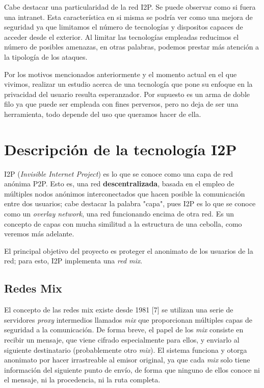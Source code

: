 \documentclass[12]{article}
\begin{document}
Cabe destacar una particularidad de la red I2P. Se puede observar como si fuera una intranet. Esta característica en si misma se podría ver 
como una mejora de seguridad ya que limitamos el número de tecnologías y dispositos capaces de acceder desde el exterior. Al limitar las tecnologías 
empleadas reducimos el número de posibles amenazas, en otras palabras, podemos prestar más atención a la tipología de los ataques. 

Por los motivos mencionados anteriormente y el momento actual en el que vivimos, realizar un estudio acerca de una tecnología que 
pone su enfoque en la privacidad del usuario resulta esperanzador. Por supuesto es un arma de doble filo ya que puede ser empleada con fines 
perversos, pero no deja de ser una herramienta, todo depende del uso que queramos hacer de ella.

\pagebreak

\section{Descripción de la tecnología I2P}

I2P (\textit{Invisible Internet Project}) es lo que se conoce como una capa de red anónima P2P. Esto es, una red \textbf{descentralizada}, basada en el empleo de múltiples nodos anónimos interconectados
que hacen posible la comunicación entre dos usuarios; cabe destacar la palabra "capa", pues I2P es lo que se conoce como un \textit{overlay network}, una red funcionando encima de otra red. Es un concepto
de capas con mucha similitud a la estructura de una cebolla, como veremos más adelante.

El principal objetivo del proyecto es proteger el anonimato de los usuarios de la red; para esto, I2P implementa una \textit{red mix}.

\subsection{Redes Mix}
El concepto de las redes mix existe desde 1981 [7] se utilizan una serie de servidores \textit{proxy} intermedios llamados \textit{mix} que proporcionan múltiples
capas de seguridad a la comunicación. De forma breve, el papel de los \textit{mix} consiste en recibir un mensaje, que viene cifrado especialmente para ellos,
y enviarlo al siguiente destinatario (probablemente otro \textit{mix}).
El sistema funciona y otorga anonimato por hacer irrastreable al emisor original, ya que cada \textit{mix} solo tiene información del siguiente punto de envío, de forma que ninguno de ellos conoce
ni el mensaje, ni la procedencia, ni la ruta completa.
\end{document}
